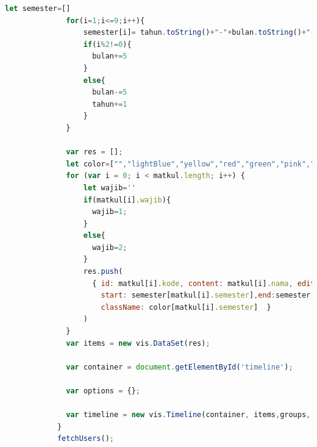 \begin{itemize}
\begin{itemize}
\begin{itemize}
\begin{lstlisting}[language=JavaScript, caption=Kode untuk membuat Visualisasi Network\label{lst:kodeMembuatTimeline}]
              let semester=[]
              for(i=1;i<=9;i++){
                  semester[i]= tahun.toString()+"-"+bulan.toString()+"- 31"
                  if(i%2!=0){
                    bulan+=5
                  }
                  else{
                    bulan-=5
                    tahun+=1
                  }
              }
        
              var res = [];
              let color=["","lightBlue","yellow","red","green","pink","purple","orange","darkBlue"]
              for (var i = 0; i < matkul.length; i++) {
                  let wajib=''
                  if(matkul[i].wajib){
                    wajib=1;
                  }
                  else{
                    wajib=2;
                  }
                  res.push(
                    { id: matkul[i].kode, content: matkul[i].nama, editable: false,group:wajib , 
                      start: semester[matkul[i].semester],end:semester[matkul[i].semester+1], 
                      className: color[matkul[i].semester]  }
                  )
              }
              var items = new vis.DataSet(res);
              
              var container = document.getElementById('timeline');
        
              var options = {};
        
              var timeline = new vis.Timeline(container, items,groups, options); 
            }
            fetchUsers();
            \end{lstlisting}
            
        \end{itemize}
    \end{itemize}
\end{itemize}
 

